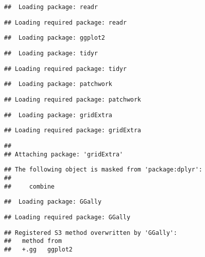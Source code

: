 \documentclass[
]{article}
\begin{document}
\begin{verbatim}
##  Loading package: readr
\end{verbatim}

\begin{verbatim}
## Loading required package: readr
\end{verbatim}

\begin{verbatim}
##  Loading package: ggplot2
\end{verbatim}

\begin{verbatim}
##  Loading package: tidyr
\end{verbatim}

\begin{verbatim}
## Loading required package: tidyr
\end{verbatim}

\begin{verbatim}
##  Loading package: patchwork
\end{verbatim}

\begin{verbatim}
## Loading required package: patchwork
\end{verbatim}

\begin{verbatim}
##  Loading package: gridExtra
\end{verbatim}

\begin{verbatim}
## Loading required package: gridExtra
\end{verbatim}

\begin{verbatim}
## 
## Attaching package: 'gridExtra'
\end{verbatim}

\begin{verbatim}
## The following object is masked from 'package:dplyr':
## 
##     combine
\end{verbatim}

\begin{verbatim}
##  Loading package: GGally
\end{verbatim}

\begin{verbatim}
## Loading required package: GGally
\end{verbatim}

\begin{verbatim}
## Registered S3 method overwritten by 'GGally':
##   method from   
##   +.gg   ggplot2
\end{verbatim}
\end{document}
